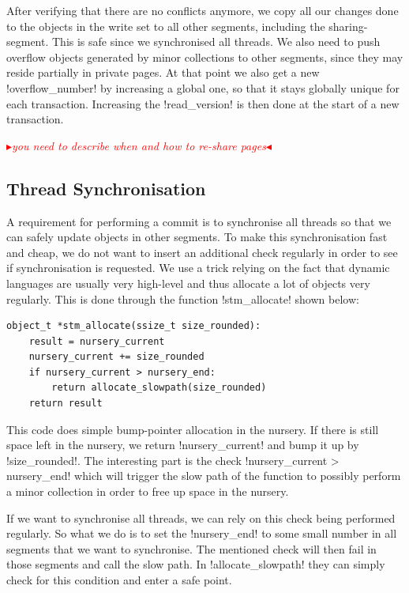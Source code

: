 \documentclass{sigplanconf}
\makeatletter
\renewcommand\lstinline[1][]{%
  \Collectverb{\@@myverb}%
}
\def\@@myverb#1{%
    \begingroup
    \fboxsep=0.2em
    \colorbox{verylightgray}{\oldlstinline|#1|}%
    \endgroup
}
\newcommand{\mynote}[2]{%
  \textcolor{red}{%
    \fbox{\bfseries\sffamily\scriptsize#1}%
    {\small$\blacktriangleright$\textsf{\emph{#2}}$\blacktriangleleft$}%
  }%
}
\newcommand\cfbolz[1]{\mynote{cfbolz}{#1}}
\makeatother
\begin{document}
After verifying that there are no conflicts anymore, we copy all our
changes done to the objects in the write set to all other segments,
including the sharing-segment. This is safe since we synchronised all
threads. We also need to push overflow objects generated by minor
collections to other segments, since they may reside partially in
private pages. At that point we also get a new
\lstinline!overflow_number! by increasing a global one, so that it
stays globally unique for each transaction. Increasing the
\lstinline!read_version!  is then done at the start of a new
transaction.

\cfbolz{you need to describe when and how to re-share pages}


\subsection{Thread Synchronisation}

A requirement for performing a commit is to synchronise all threads so
that we can safely update objects in other segments. To make this
synchronisation fast and cheap, we do not want to insert an additional
check regularly in order to see if synchronisation is requested. We
use a trick relying on the fact that dynamic languages are usually
very high-level and thus allocate a lot of objects very regularly.
This is done through the function \lstinline!stm_allocate!  shown
below:

\begin{lstlisting}
object_t *stm_allocate(ssize_t size_rounded):
    result = nursery_current
	nursery_current += size_rounded
	if nursery_current > nursery_end:
		return allocate_slowpath(size_rounded)
	return result
\end{lstlisting}


This code does simple bump-pointer allocation in the nursery. If there
is still space left in the nursery, we return
\lstinline!nursery_current!  and bump it up by
\lstinline!size_rounded!.  The interesting part is the check
\lstinline!nursery_current > nursery_end!  which will trigger the slow
path of the function to possibly perform a minor collection in order
to free up space in the nursery.

If we want to synchronise all threads, we can rely on this check being
performed regularly. So what we do is to set the
\lstinline!nursery_end!  to some small number in all segments that we
want to synchronise. The mentioned check will then fail in those
segments and call the slow path. In \lstinline!allocate_slowpath!
they can simply check for this condition and enter a safe point.
\end{document}
